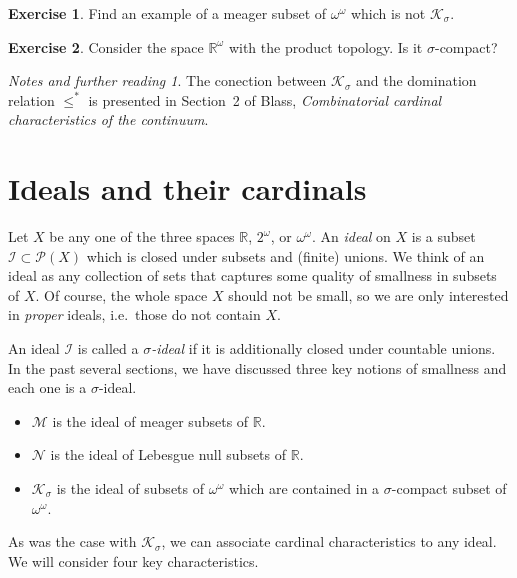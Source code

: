 \documentclass[11pt,oneside]{amsbook}
\newcommand{\RR}{\mathbb R}
\newcommand{\Null}{\mathcal N}
\newcommand{\Meager}{\mathcal M}
\newcommand{\Ksigma}{\mathcal K_\sigma}
\theoremstyle{definition}
\newtheorem{exerc}{Exercise}[section]
\theoremstyle{plain}
\theoremstyle{definition}
\theoremstyle{remark}
\newtheorem*{notes}{Notes and further reading}
\numberwithin{equation}{section}
\numberwithin{figure}{section}
\begin{document}
\begin{exerc}
  Find an example of a meager subset of $\omega^\omega$ which is not $\Ksigma$.
\end{exerc}

\begin{exerc}
  Consider the space $\RR^\omega$ with the product topology. Is it $\sigma$-compact?
\end{exerc}

\begin{notes}
  The conection between $\mathcal K_\sigma$ and the domination relation $\leq^*$ is presented in Section~2 of Blass, \emph{Combinatorial cardinal characteristics of the continuum}.
\end{notes}


\section{Ideals and their cardinals}

Let $X$ be any one of the three spaces $\RR$, $2^\omega$, or $\omega^\omega$. An \emph{ideal} on $X$ is a subset $\mathcal I\subset\mathcal P(X)$ which is closed under subsets and (finite) unions. We think of an ideal as any collection of sets that captures some quality of smallness in subsets of $X$. Of course, the whole space $X$ should not be small, so we are only interested in \emph{proper} ideals, i.e.\ those do not contain $X$.

An ideal $\mathcal I$ is called a \emph{$\sigma$-ideal} if it is additionally closed under countable unions. In the past several sections, we have discussed three key notions of smallness and each one is a $\sigma$-ideal.
\begin{itemize}
\item $\Meager$ is the ideal of meager subsets of $\RR$.
\item $\Null$ is the ideal of Lebesgue null subsets of $\RR$.
\item $\Ksigma$ is the ideal of subsets of $\omega^\omega$ which are contained in a $\sigma$-compact subset of $\omega^\omega$.
\end{itemize}

As was the case with $\Ksigma$, we can associate cardinal characteristics to any ideal. We will consider four key characteristics.
\end{document}
